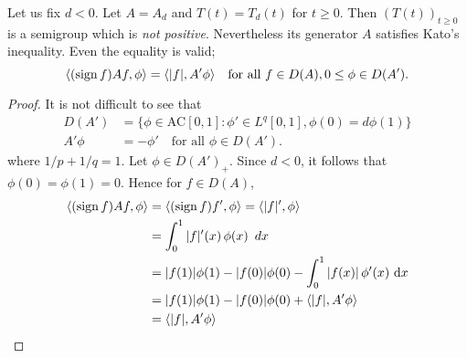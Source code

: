 Let us fix $d < 0$. Let $A = A_{d}$ and $T(t) = T_{d}(t)$ for $t \geq 0$. Then
$(T(t))_{t \geq 0}$ is a semigroup which is \emph{not positive}. Nevertheless its generator $A$ satisfies Kato's inequality. Even the equality is valid;
\ie
\begin{equation}\label{eq:c2-3.10}
\langle(\operatorname{sign}  f) Af,\phi\rangle = \langle|f|,A'\phi \rangle \quad \text{for all } f \in D(A), 0 \leq \phi \in D(A').
\end{equation}

\begin{proof}
It is not difficult to see that
\begin{equation}\label{eq:c2-3.11}
\begin{array}{rl}
D(A') &= \{\phi \in \text{AC}[0,1] \colon \phi' \in L^{q}[0,1], \phi(0) = d\phi(1)\}\\ 
A'\phi &= -\phi' \quad \text{for all } \phi \in D(A').
\end{array}
\end{equation}
where $1/p + 1/q = 1$. Let $\phi \in D(A')_{+}$. 
Since $d < 0$, it follows that $\phi(0) = \phi(1) = 0$. 
Hence for $f \in D(A)$,
\begin{align*}
\langle(\operatorname{sign}  f)Af,\phi\rangle &= \langle(\operatorname{sign}  f)f',\phi\rangle = \langle|f|',\phi\rangle\\
&= \int_{0}^{1} |f|'(x) \, \phi(x) \,\ dx\\
&= |f(1)|\phi(1) - |f(0)|\phi(0) - \int_{0}^{1} |f(x)| \, \phi'(x) \, \mathop{}\!\mathrm{d}{x}\\
&= |f(1)|\phi(1) - |f(0)|\phi(0) + \langle|f|,A'\phi\rangle\\
&= \langle|f|,A'\phi\rangle
\end{align*}
\end{proof}

